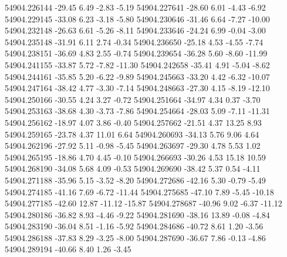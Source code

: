 54904.226144      -29.45        6.49       -2.83       -5.19
54904.227641      -28.60        6.01       -4.43       -6.92
54904.229145      -33.08        6.23       -3.18       -5.80
54904.230646      -31.46        6.64       -7.27      -10.00
54904.232148      -26.63        6.61       -5.26       -8.11
54904.233646      -24.24        6.99       -0.04       -3.00
54904.235148      -31.91        6.11        2.74       -0.34
54904.236650      -25.18        4.53       -4.55       -7.74
54904.238151      -36.69        4.83        2.55       -0.74
54904.239654      -36.28        5.60       -8.60      -11.99
54904.241155      -33.87        5.72       -7.82      -11.30
54904.242658      -35.41        4.91       -5.04       -8.62
54904.244161      -35.85        5.20       -6.22       -9.89
54904.245663      -33.20        4.42       -6.32      -10.07
54904.247164      -38.42        4.77       -3.30       -7.14
54904.248663      -27.30        4.15       -8.19      -12.10
54904.250166      -30.55        4.24        3.27       -0.72
54904.251664      -34.97        4.34        0.37       -3.70
54904.253163      -38.68        4.30       -3.73       -7.86
54904.254664      -28.03        5.09       -7.11      -11.31
54904.256162      -18.97        4.07        3.86       -0.40
54904.257662      -21.51        4.37       13.25        8.93
54904.259165      -23.78        4.37       11.01        6.64
54904.260693      -34.13        5.76        9.06        4.64
54904.262196      -27.92        5.11       -0.98       -5.45
54904.263697      -29.30        4.78        5.53        1.02
54904.265195      -18.86        4.70        4.45       -0.10
54904.266693      -30.26        4.53       15.18       10.59
54904.268190      -34.08        5.68        4.09       -0.53
54904.269690      -38.42        5.37        0.54       -4.11
54904.271188      -35.96        5.15       -3.52       -8.20
54904.272686      -42.16        5.30       -0.79       -5.49
54904.274185      -41.16        7.69       -6.72      -11.44
54904.275685      -47.10        7.89       -5.45      -10.18
54904.277185      -42.60       12.87      -11.12      -15.87
54904.278687      -40.96        9.02       -6.37      -11.12
54904.280186      -36.82        8.93       -4.46       -9.22
54904.281690      -38.16       13.89       -0.08       -4.84
54904.283190      -36.04        8.51       -1.16       -5.92
54904.284686      -40.72        8.61        1.20       -3.56
54904.286188      -37.83        8.29       -3.25       -8.00
54904.287690      -36.67        7.86       -0.13       -4.86
54904.289194      -40.66        8.40        1.26       -3.45
